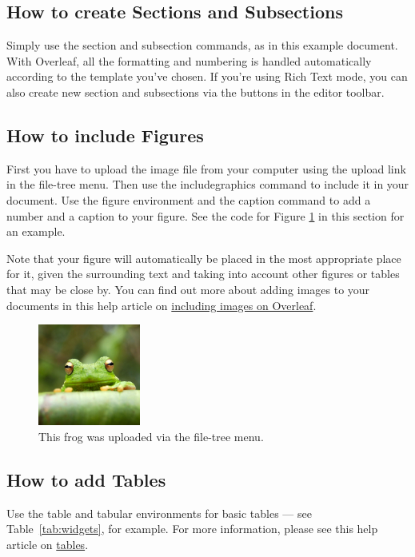 \subsection{How to create Sections and Subsections}

Simply use the section and subsection commands, as in this example document. With Overleaf, all the formatting and numbering is handled automatically according to the template you've chosen. If you're using Rich Text mode, you can also create new section and subsections via the buttons in the editor toolbar.

\subsection{How to include Figures}

First you have to upload the image file from your computer using the upload link in the file-tree menu. Then use the includegraphics command to include it in your document. Use the figure environment and the caption command to add a number and a caption to your figure. See the code for Figure \ref{fig:frog} in this section for an example.

Note that your figure will automatically be placed in the most appropriate place for it, given the surrounding text and taking into account other figures or tables that may be close by. You can find out more about adding images to your documents in this help article on \href{https://www.overleaf.com/learn/how-to/Including_images_on_Overleaf}{including images on Overleaf}.

\begin{figure}
\centering
\includegraphics[width=0.3\textwidth]{figures/frog.jpg}
\caption{\label{fig:frog}This frog was uploaded via the file-tree menu.}
\end{figure}

\subsection{How to add Tables}

Use the table and tabular environments for basic tables --- see Table~\ref{tab:widgets}, for example. For more information, please see this help article on \href{https://www.overleaf.com/learn/latex/tables}{tables}. 

